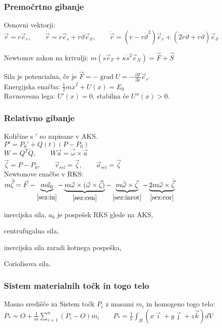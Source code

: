 \documentclass[a4paper,10pt]{article}
\title{\mytitle}
\author{Jure Slak}
\date{\today}
\theoremstyle{definition}
\newenvironment{enumerate*}%
{
\vspace{-6pt}
\begin{enumerate}[(1)]
\setlength{\itemsep}{0pt}
\setlength{\parskip}{2pt}
}
{\end{enumerate}}
\DeclareMathOperator{\grad}{grad}
\let\theta\vartheta
\newcommand{\vzeta}{\vec{\zeta}}
\newcommand{\dzeta}{\dot{\vzeta}}
\newcommand{\ddzeta}{\ddot{\vzeta}}
\newcommand{\vomega}{\vec{\omega}}
\newcommand{\domega}{\dot{\vomega}}
\newcommand{\va}{\vec{a}}
\newcommand{\vr}{\vec{r}}
\newcommand{\dr}{\dot{\vr}}
\newcommand{\ddr}{\ddot{\vr}}
\newcommand{\er}{\vec{e}_r}
\newcommand{\eq}{\vec{e}_{\theta}}
\newcommand{\Pt}{P_{\ast}}
\begin{document}
\subsubsection*{Premočrtno gibanje}
Osnovni vektorji: $\vr = r\er, \qquad \dr = \dot{r}\er + r\dot{\theta}\eq,
\qquad \ddr = (\ddot{r} - r\dot{\theta}^2)\er + (2\dot{r}\dot{\theta} +
r\ddot{\theta})\eq$

Newtonov zakon na krivulji: $m(\ddot{s}\vec{e}_T + \kappa\dot{s}^2\vec{e}_N)
= \vec{F} + \vec{S}$

Sila je potencialna, če je $\vec{F} = -\grad U = - \frac{\partial F}{\partial
r}\er$. \\
Energijska enačba: $\frac12m\dot{x}^2 + U(x) = E_0$ \\
Ravnovesna lega: $U'(x) = 0$, stabilna če $U''(x) > 0$. \\

\subsubsection*{Relativno gibanje}
Količine s $'$ so zapisane v AKS. \\
$P' = P_0' + Q(t)(P-P_0)$ \\
$W = Q^T\dot{Q}, \qquad  W\va = \vomega \times \va$ \\
$\vzeta = P - P_0, \qquad \vec{v}_{rel} = \dzeta, \qquad \vec{a}_{rel} =
\ddzeta$
\\
Newtonove enačbe v RKS: \\[6pt]
$m\ddzeta = \vec{F} -
\underbrace{m\va_0}_{\eqref{sez:in}} -
\underbrace{m\vomega \times (\vomega \times \vzeta)}_{\eqref{sez:cen}} -
\underbrace{m\domega\times\vzeta}_{\eqref{sez:inrot}} -
\underbrace{2m\vomega\times\dzeta}_{\eqref{sez:cor}}$

\begin{enumerate*}
  \item inercijska sila, $a_0$ je pospešek RKS glede na AKS,  \label{sez:in}
  \item centrufugalna sila,                                   \label{sez:cen}
  \item inercijska sila zaradi kotnega pospeška,              \label{sez:inrot}
  \item Coriolisova sila.                                     \label{sez:cor}
\end{enumerate*}

\subsubsection*{Sistem materialnih točk in togo telo}
Masno središče za Sistem točk $P_i$ z masami $m_i$ in homogeno togo telo: \\
$ \displaystyle \Pt = O + \frac1m \sum_{i=1}^n (P_i - O) m_i \qquad \Pt =
\frac1V \int_B (x\vec{\imath} + y\vec{\jmath} + z\vec{k})dV $
\end{document}
